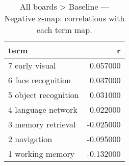 \begin{table}
\caption{All boards > Baseline — Negative z-map: correlations with each term map.}
\label{tab:All boards > Baseline_neg}
\begin{tabular}{lr}
\toprule
term & r \\
\midrule
7 early visual & 0.057000 \\
6 face recognition & 0.037000 \\
5 object recognition & 0.031000 \\
4 language network & 0.022000 \\
3 memory retrieval & -0.025000 \\
2 navigation & -0.095000 \\
1 working memory & -0.132000 \\
\bottomrule
\end{tabular}
\end{table}

